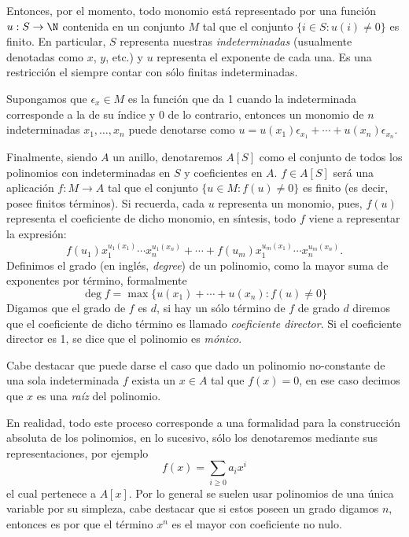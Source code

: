 \documentclass[11pt,oneside]{book}
\begin{document}
Entonces, por el momento, todo monomio está representado por una función $u:S\rightarrow\N$ contenida en un conjunto $M$ tal que el conjunto $\{i\in S:u(i)\neq 0\}$ es finito. En particular, $S$ representa nuestras \textit{indeterminadas} (usualmente denotadas como $x$, $y$, etc.) y $u$ representa el exponente de cada una. Es una restricción el siempre contar con sólo finitas indeterminadas.

Supongamos que $\epsilon_x\in M$ es la función que da 1 cuando la indeterminada corresponde a la de su índice y 0 de lo contrario, entonces un monomio de $n$ indeterminadas $x_1,\dots,x_n$ puede denotarse como $u=u(x_1)\epsilon_{x_1}+\cdots+u(x_n)\epsilon_{x_n}$.

\begin{mydef}[Polinomio]
Finalmente, siendo $A$ un anillo, denotaremos $A[S]$  como el conjunto de todos los polinomios con indeterminadas en $S$ y coeficientes en $A$. $f\in A[S]$ será una aplicación $f:M\rightarrow A$ tal que el conjunto $\{u\in M:f(u)\neq 0\}$ es finito (es decir, posee finitos términos). Si recuerda, cada $u$ representa un monomio, pues, $f(u)$ representa el coeficiente de dicho monomio, en síntesis, todo $f$ viene a representar la expresión:
$$f(u_1)x_1^{u_1(x_1)}\cdots x_n^{u_1(x_n)}+\cdots+f(u_m)x_1^{u_m(x_1)}\cdots x_n^{u_m(x_n)}.$$
Definimos el grado (en inglés, \textit{degree}) de un polinomio, como la mayor suma de exponentes por término, formalmente
$$\deg f=\max\{u(x_1)+\cdots+u(x_n):f(u)\neq 0\}$$ 
Digamos que el grado de $f$ es $d$, si hay un sólo término de $f$ de grado $d$ diremos que el coeficiente de dicho término es llamado \textit{coeficiente director}. Si el coeficiente director es 1, se dice que el polinomio es \textit{mónico}.
\end{mydef}
Cabe destacar que puede darse el caso que dado un polinomio no-constante de una sola indeterminada $f$ exista un $x\in A$ tal que $f(x)=0$, en ese caso decimos que $x$ es una \textit{raíz} del polinomio.

En realidad, todo este proceso corresponde a una formalidad para la construcción absoluta de los polinomios, en lo sucesivo, sólo los denotaremos mediante sus representaciones, por ejemplo
$$f(x)=\sum_{i\geq 0}a_ix^i$$
el cual pertenece a $A[x]$. Por lo general se suelen usar polinomios de una única variable por su simpleza, cabe destacar que si estos poseen un grado digamos $n$, entonces es por que el término $x^n$ es el mayor con coeficiente no nulo.
\end{document}
